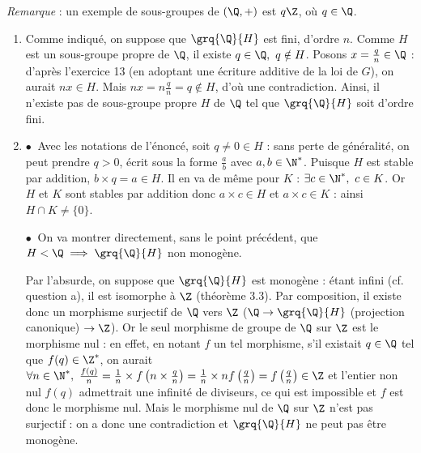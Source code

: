 \emph{Remarque} : un exemple de sous-groupes de $(\Q,+)$ est $q\Z$, où $q\in \Q$.

\begin{enumerate}
 \item Comme indiqué, on suppose que $\grq{\Q}{H}$ est fini, d'ordre $n$. Comme $H$ est un sous-groupe propre de $\Q$, il existe $q\in \Q,~ q \notin H$. Posons $x = \frac{q}{n} \in \Q$ : d'après l'exercice 13 (en adoptant une écriture additive de la loi de $G$), on aurait $nx \in H$. Mais $nx = n \frac{q}{n} = q \notin H$, d'où une contradiction. Ainsi, il n'existe pas de sous-groupe propre $H$ de $\Q$ tel que $\grq{\Q}{H}$ soit d'ordre fini.

 \item $\bullet~$ Avec les notations de l'énoncé, soit $q\neq 0 \in H$ : sans perte de généralité, on peut prendre $q>0$, écrit sous la forme $\frac{a}{b}$ avec $a,b\in \N^*$. Puisque $H$ est stable par addition, $b\times q = a\in H$. Il en va de même pour $K$ : $\exists c\in \N^*,~ c\in K$. Or $H$ et $K$ sont stables par addition donc $a\times c \in H$ et $a\times c \in K$ : ainsi $H\cap K\neq \{0\}$.

 $\bullet~$ On va montrer directement, sans le point précédent, que $H< \Q \implies \grq{\Q}{H}$ non monogène.

 Par l'absurde, on suppose que $\grq{\Q}{H}$ est monogène : étant infini (cf. question a), il est isomorphe à $\Z$ (théorème 3.3). Par composition, il existe donc un morphisme surjectif de $\Q$ vers $\Z$ ($\Q\to \grq{\Q}{H}$ (projection canonique) $ \to \Z$). Or le seul morphisme de groupe de $\Q$ sur $\Z$ est le morphisme nul : en effet, en notant $f$ un tel morphisme, s'il existait $q\in \Q$ tel que $f(q)\in \Z^*$, on aurait $\forall n\in \N^*,~ \frac{f(q)}{n} = \frac{1}{n}\times f\left(n\times \frac{q}{n}\right) = \frac{1}{n}\times n f\left(\frac{q}{n}\right) = f\left(\frac{q}{n}\right) \in \Z$ et l'entier non nul $f(q)$ admettrait une infinité de diviseurs, ce qui est impossible et $f$ est donc le morphisme nul. Mais le morphisme nul de $\Q$ sur $\Z$ n'est pas surjectif : on a donc une contradiction et $\grq{\Q}{H}$ ne peut pas être monogène.
\end{enumerate}
